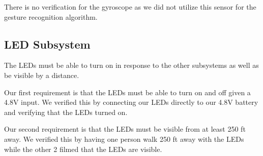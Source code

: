 There is no verification for the gyroscope as we did not utilize this sensor for the gesture recognition algorithm. 

\subsection{LED Subsystem}
The LEDs must be able to turn on in response to the other subsystems as well as be visible by a distance. 

Our first requirement is that the LEDs must be able to turn on and off given a 4.8V input. We verified this by connecting our LEDs directly to our 4.8V battery and verifying that the LEDs turned on.

Our second requirement is that the LEDs must be visible from at least 250 ft away. We verified this by having one person walk 250 ft away with the LEDs while the other 2 filmed that the LEDs are visible.

\nocite{sparkfun2023icm20948}